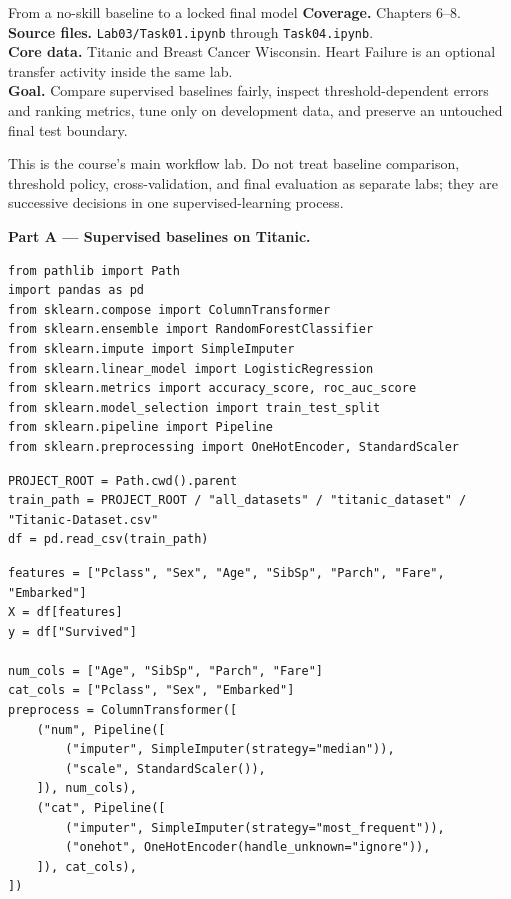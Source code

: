 
\begin{labproject}{From a no-skill baseline to a locked final model}
\textbf{Coverage.} Chapters 6--8.\\
\textbf{Source files.} \texttt{Lab03/Task01.ipynb} through \texttt{Task04.ipynb}.\\
\textbf{Core data.} Titanic and Breast Cancer Wisconsin. Heart Failure is an optional transfer activity inside the same lab.\\
\textbf{Goal.} Compare supervised baselines fairly, inspect threshold-dependent errors and ranking metrics, tune only on development data, and preserve an untouched final test boundary.

\begin{labmode}
This is the course's main workflow lab. Do not treat baseline comparison, threshold policy, cross-validation, and final evaluation as separate labs; they are successive decisions in one supervised-learning process.
\end{labmode}

\medskip\noindent\textbf{Part A --- Supervised baselines on Titanic.}\par
\begin{lstlisting}[style=mlpython]
from pathlib import Path
import pandas as pd
from sklearn.compose import ColumnTransformer
from sklearn.ensemble import RandomForestClassifier
from sklearn.impute import SimpleImputer
from sklearn.linear_model import LogisticRegression
from sklearn.metrics import accuracy_score, roc_auc_score
from sklearn.model_selection import train_test_split
from sklearn.pipeline import Pipeline
from sklearn.preprocessing import OneHotEncoder, StandardScaler
\end{lstlisting}

\begin{lstlisting}[style=mlpython]
PROJECT_ROOT = Path.cwd().parent
train_path = PROJECT_ROOT / "all_datasets" / "titanic_dataset" / "Titanic-Dataset.csv"
df = pd.read_csv(train_path)
\end{lstlisting}

\begin{lstlisting}[style=mlpython]
features = ["Pclass", "Sex", "Age", "SibSp", "Parch", "Fare", "Embarked"]
X = df[features]
y = df["Survived"]

num_cols = ["Age", "SibSp", "Parch", "Fare"]
cat_cols = ["Pclass", "Sex", "Embarked"]
preprocess = ColumnTransformer([
    ("num", Pipeline([
        ("imputer", SimpleImputer(strategy="median")),
        ("scale", StandardScaler()),
    ]), num_cols),
    ("cat", Pipeline([
        ("imputer", SimpleImputer(strategy="most_frequent")),
        ("onehot", OneHotEncoder(handle_unknown="ignore")),
    ]), cat_cols),
])
\end{lstlisting}


\end{labproject}

